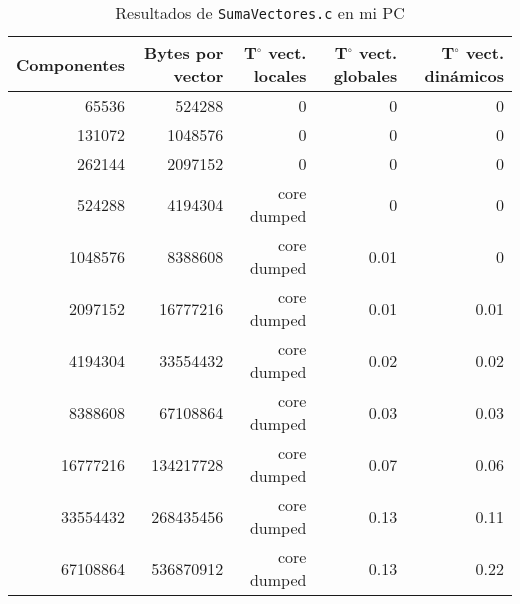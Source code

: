 \begin{center}
\begin{table}[!h]
\begin{tabular}{r r r r r}
\textbf{Componentes} & \textbf{Bytes por vector} & \textbf{T$^\circ$ vect. locales} & \textbf{T$^\circ$ vect. globales} & \textbf{T$^\circ$ vect. dinámicos} \\
\toprule
65536                   & 524288                      & 0                         & 0                          & 0                           \\
131072                  & 1048576                     & 0                         & 0                          & 0                           \\
262144                  & 2097152                     & 0                         & 0                          & 0                           \\
524288                  & 4194304                     & core dumped               & 0                          & 0                           \\
1048576                 & 8388608                     & core dumped               & 0.01                       & 0                           \\
2097152                 & 16777216                    & core dumped               & 0.01                       & 0.01                        \\
4194304                 & 33554432                    & core dumped               & 0.02                       & 0.02                        \\
8388608                 & 67108864                    & core dumped               & 0.03                       & 0.03                        \\
16777216                & 134217728                   & core dumped               & 0.07                       & 0.06                        \\
33554432                & 268435456                   & core dumped               & 0.13                       & 0.11                        \\
67108864                & 536870912                   & core dumped               & 0.13                       & 0.22                        \\
\end{tabular}
\caption{Resultados de \texttt{SumaVectores.c} en mi PC}
\end{table}


\end{center}
